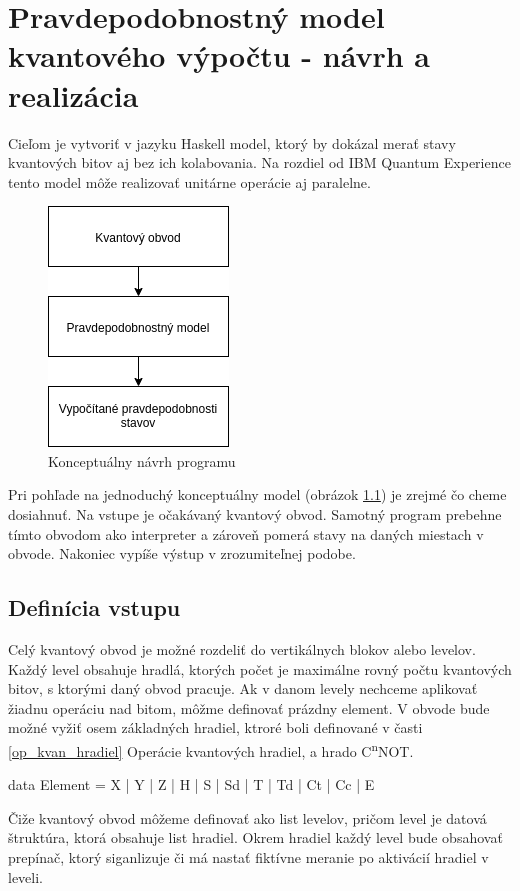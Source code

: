 
\chapter{Pravdepodobnostný model kvantového výpočtu - návrh a realizácia}

Cieľom je vytvoriť v jazyku Haskell model, ktorý by dokázal merať stavy
kvantových bitov aj bez ich kolabovania. Na rozdiel od IBM Quantum
Experience tento model môže realizovať unitárne operácie aj paralelne.

\begin{figure}
	\centering 
	\includegraphics[width=.2\textwidth]{figures/navrh.png} 
	\caption{Konceptuálny návrh programu}
    \label{navrh}
\end{figure}


Pri pohľade na jednoduchý konceptuálny model (obrázok \ref{navrh}) je zrejmé
čo cheme dosiahnuť. Na vstupe je očakávaný kvantový obvod. Samotný program
prebehne tímto obvodom ako interpreter a zároveň pomerá stavy na daných
miestach v obvode. Nakoniec vypíše výstup v zrozumiteľnej podobe.

\section{Definícia vstupu}

Celý kvantový obvod je možné rozdeliť do vertikálnych blokov alebo levelov.
Každý level obsahuje hradlá, ktorých počet je maximálne rovný počtu 
kvantových bitov, s ktorými daný obvod pracuje. Ak v danom levely nechceme
aplikovať žiadnu operáciu nad bitom, môžme definovať prázdny element.
V obvode bude možné vyžiť osem základných hradiel, ktroré boli definované
v časti \ref{op_kvan_hradiel} Operácie kvantových hradiel, a hrado 
C\textsuperscript{n}NOT.

\begin{code}
data Element = X
    | Y
    | Z
    | H
    | S
    | Sd
    | T
    | Td
    | Ct
    | Cc
    | E
\end{code}

Čiže kvantový obvod môžeme definovať ako list levelov, pričom level je datová
štruktúra, ktorá obsahuje list hradiel. Okrem hradiel každý level bude
obsahovať prepínač, ktorý siganlizuje či má nastať fiktívne meranie po 
aktivácií hradiel v leveli.


